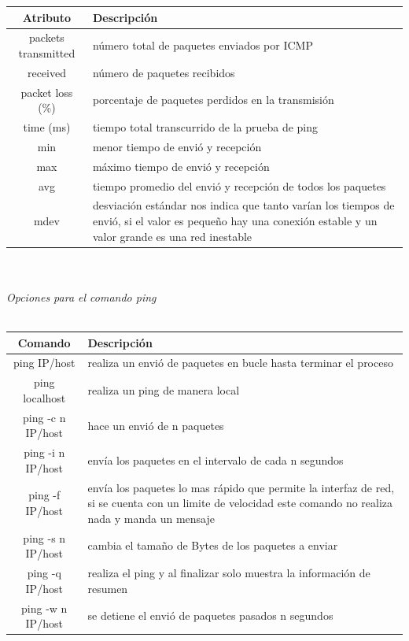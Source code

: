 \documentclass[10pt,a4paper,titlepage]{article}
\begin{document}
	\begin{tabular}{|c|p{8cm}|}
		\hline
		Atributo & Descripción \\
		\hline
		packets transmitted & número total de paquetes enviados por ICMP \\
		\hline
		received & número de paquetes recibidos \\
		\hline
		packet loss (\%) & porcentaje de paquetes perdidos en la transmisión \\
		\hline
		time (ms) & tiempo total transcurrido de la prueba de ping \\
		\hline
		min & menor tiempo de envió y recepción \\
		\hline
		max & máximo tiempo de envió y recepción \\
		\hline
		avg & tiempo promedio del envió y recepción de todos los paquetes \\
		\hline
		mdev & desviación estándar nos indica que tanto varían los tiempos de envió, si el valor es pequeño hay una conexión estable y un valor grande es una red inestable \\
		\hline
	\end{tabular}
	\\
	\\
	\emph{Opciones para el comando ping}
	\\
	\\
	\begin{tabular}{|c|p{8cm}|}
		\hline
		Comando & Descripción \\
		\hline
		ping IP/host & realiza un envió de paquetes en bucle hasta terminar el proceso \\
		\hline
		ping localhost & realiza un ping de manera local \\
		\hline
		ping -c n IP/host & hace un envió de n paquetes  \\
		\hline
		ping -i n IP/host & envía los paquetes en el intervalo de cada n segundos  \\
		\hline
		ping -f IP/host & envía los paquetes lo mas rápido que permite la interfaz de red, si se cuenta con un limite de velocidad este comando no realiza nada y manda un mensaje \\
		\hline
		ping -s n IP/host & cambia el tamaño de Bytes de los paquetes a enviar \\
		\hline
		ping -q IP/host & realiza el ping y al finalizar solo muestra la información de resumen \\
		\hline
		ping -w n IP/host & se detiene el envió de paquetes pasados n segundos \\
		\hline
	\end{tabular}
\end{document}
